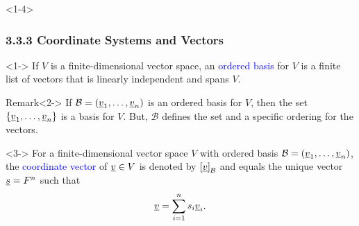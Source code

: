 \documentclass[10pt,english,aspectratio=169]{beamer}
\begin{document}
\begin{frame}<1-4> \frametitle{3.3.3 Coordinate Systems and Vectors}

\vspace{-1mm}

\begin{definition}<1->
If $V$ is a finite-dimensional vector space, an \textcolor{blue}{ordered basis} for $V$ is a finite list of vectors that is linearly independent and spans $V$.
\end{definition}

\begin{exampleblock}{Remark}<2->
If $\mathcal{B} = (\underline{v}_1, \ldots, \underline{v}_n )$ is an ordered basis for $V$, then the set $\left\{ \underline{v}_1, \ldots, \underline{v}_n \right\}$ is a basis for $V$.
But, $\mathcal{B}$ defines the set and a specific ordering for the vectors.
\end{exampleblock}

\begin{definition}<3->
For a finite-dimensional vector space $V$ with ordered basis $\mathcal{B}=(\underline{v}_1, \ldots, \underline{v}_n )$, the \textcolor{blue}{coordinate vector} of $\underline{v} \in V$ is denoted by $\left[ \underline{v} \right]_{\mathcal{B}}$ and equals the unique vector $\underline{s} = F^n$ such that \vspace{-1mm}
\[ \underline{v} = \sum_{i=1}^n s_i \underline{v}_i. \]  
\end{definition}

\vspace{-0.5mm}



\end{frame}
\end{document}
